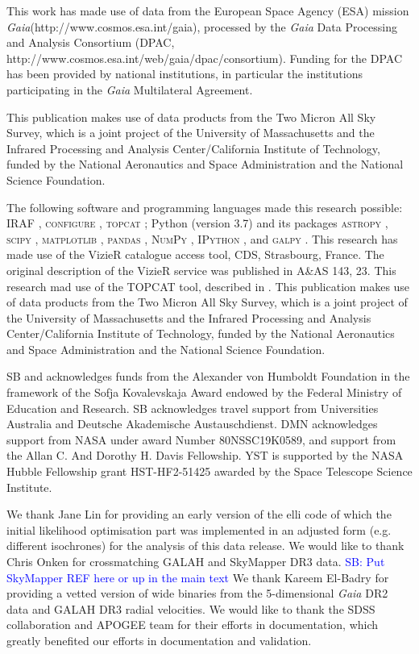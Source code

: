 \documentclass[fleqn,usenatbib,useAMS]{mnras}
\newcommand{\Gaia}{\textit{Gaia}\xspace}
\newcommand\SB[1]{\textcolor{blue}{SB: #1}}
\begin{document}
This work has made use of data from the European Space Agency (ESA) mission \Gaia (http://www.cosmos.esa.int/gaia), processed by the \Gaia Data Processing and Analysis Consortium (DPAC, http://www.cosmos.esa.int/web/gaia/dpac/consortium). Funding for the DPAC has been provided by national institutions, in particular the institutions participating in the \Gaia Multilateral Agreement. 

This publication makes use of data products from the Two Micron All Sky Survey, which is a joint project of the University of Massachusetts and the Infrared Processing and Analysis Center/California Institute of Technology, funded by the National Aeronautics and Space Administration and the National Science Foundation.

The following software and programming languages made this research possible: \textsc{IRAF} \citep{Tody1986,Tody1993}, \textsc{configure} \citep{Miszalski2006}, \textsc{topcat} \citep[version 4.4;][]{Taylor2005}; Python (version 3.7) and its packages {\textsc{astropy}} \citep[version 2.0;][]{Robitaille2013,PriceWhelan2018}, {\textsc{scipy}} \citep{scipy}, {\textsc{matplotlib}} \citep{matplotlib}, {\textsc{pandas}} \citep[version 0.20.2;][]{McKinney2011}, {\textsc{NumPy}} \citep{numpy}, {\textsc{IPython}} \citep{ipython}, and  \textsc{galpy} \citep[version 1.3;][]{Bovy2015}. This research has made use of the VizieR catalogue access tool, CDS, Strasbourg, France. The original description of the VizieR service was published in A\&AS 143, 23. This research mad use of the TOPCAT tool, described in \citet{Taylor2005}. This publication makes use of data products from the Two Micron All Sky Survey, which is a joint project of the University of Massachusetts and the Infrared Processing and Analysis Center/California Institute of Technology, funded by the National Aeronautics and Space Administration and the National Science Foundation.

SB and acknowledges funds from the Alexander von Humboldt Foundation in the framework of the Sofja Kovalevskaja Award endowed by the Federal Ministry of Education and Research. SB acknowledges travel support from Universities Australia and Deutsche Akademische Austauschdienst. DMN acknowledges support from NASA under award Number 80NSSC19K0589, and support from the  Allan C. And Dorothy H. Davis Fellowship. YST is supported by the NASA Hubble Fellowship grant HST-HF2-51425 awarded by the Space Telescope Science Institute.

We thank Jane Lin for providing an early version of the {\sc elli} code \citep{Lin2018} of which the initial likelihood optimisation part was implemented in an adjusted form (e.g. different isochrones) for the analysis of this data release.
We would like to thank Chris Onken for crossmatching GALAH and SkyMapper DR3 data. \SB{Put SkyMapper REF here or up in the main text}
We thank Kareem El-Badry for providing a vetted version of wide binaries from the 5-dimensional \Gaia DR2 data and GALAH DR3 radial velocities.
We would like to thank the SDSS collaboration and APOGEE team for their efforts in documentation, which greatly benefited our efforts in documentation and validation.
\end{document}
